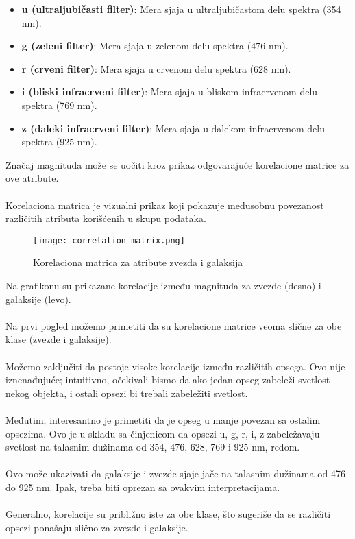 \documentclass[a4paper,12pt]{article}
\begin{document}
\begin{itemize}
    \item \textbf{u (ultraljubičasti filter)}: Mera sjaja u ultraljubičastom delu spektra (354 nm).
    \item \textbf{g (zeleni filter)}: Mera sjaja u zelenom delu spektra (476 nm).
    \item \textbf{r (crveni filter)}: Mera sjaja u crvenom delu spektra (628 nm).
    \item \textbf{i (bliski infracrveni filter)}: Mera sjaja u bliskom infracrvenom delu spektra (769 nm).
    \item \textbf{z (daleki infracrveni filter)}: Mera sjaja u dalekom infracrvenom delu spektra (925 nm).
\end{itemize}
Značaj magnituda može se uočiti kroz prikaz odgovarajuće korelacione matrice za ove atribute.
\\\\Korelaciona matrica je vizualni prikaz koji pokazuje međusobnu povezanost različitih atributa korišćenih u skupu podataka.

\clearpage

\begin{figure}[h!]
\centering
\texttt{[image: correlation\_matrix.png]}
\caption{Korelaciona matrica za atribute zvezda i galaksija}
\label{fig:correlation_matrix}
\end{figure}

Na grafikonu su prikazane korelacije između magnituda za zvezde (desno) i galaksije (levo).
\\\\Na prvi pogled možemo primetiti da su korelacione matrice veoma slične za obe klase (zvezde i galaksije).
\\\\Možemo zaključiti da postoje visoke korelacije između različitih opsega. Ovo nije iznenađujuće; intuitivno, očekivali bismo da ako jedan opseg zabeleži svetlost nekog objekta, i ostali opsezi bi trebali zabeležiti svetlost.
\\\\Međutim, interesantno je primetiti da je opseg u manje povezan sa ostalim opsezima. Ovo je u skladu sa činjenicom da opsezi u, g, r, i, z zabeležavaju svetlost na talasnim dužinama od 354, 476, 628, 769 i 925 nm, redom.
\\\\Ovo može ukazivati da galaksije i zvezde sjaje jače na talasnim dužinama od 476 do 925 nm. Ipak, treba biti oprezan sa ovakvim interpretacijama.
\\\\Generalno, korelacije su približno iste za obe klase, što sugeriše da se različiti opsezi ponašaju slično za zvezde i galaksije.
\end{document}
